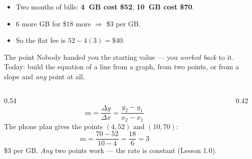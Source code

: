 \documentclass[aspectratio=169, 11pt]{beamer}
\newcommand{\lgrid}[4]{%
  \draw[step=1, linegray!45, thin] (#1,#3) grid (#2,#4);
  \draw[->, thick, charcoal] (#1,0)--(#2,0) node[below right, font=\tiny]{$x$};
  \draw[->, thick, charcoal] (0,#3)--(0,#4) node[left, font=\tiny]{$y$};}
\begin{document}
\begin{frame}[t, plain]
  \begin{itemize}\setlength{\itemsep}{5pt}
    \item Two months of bills: \textbf{4~GB cost \$52}, \textbf{10~GB cost \$70}.
    \item $6$ more GB for \$$18$ more \; $\Rightarrow$ \; \$$3$ per GB.
    \item So the flat fee is $52 - 4(3) = \$40$.
  \end{itemize}
  \vspace{6pt}
  \begin{block}{The point}
    Nobody handed you the starting value --- you \emph{worked back} to it. Today: build the equation
    of a line from a graph, from two points, or from a slope and \emph{any} point at all.
  \end{block}
\end{frame}

\begin{frame}[t, plain]
  \begin{columns}[T]
    \begin{column}{0.54\textwidth}
      \[ m=\frac{\Delta y}{\Delta x}=\frac{y_2-y_1}{x_2-x_1} \]
      The phone plan gives the points $(4,52)$ and $(10,70)$:
      \[ m=\frac{70-52}{10-4}=\frac{18}{6}=3 \]
      \$3 per GB. \; \emph{Any} two points work --- the rate is constant (Lesson 1.0).
    \end{column}
    \begin{column}{0.42\textwidth}
      \centering
    \end{column}
  \end{columns}
\end{frame}
\end{document}
